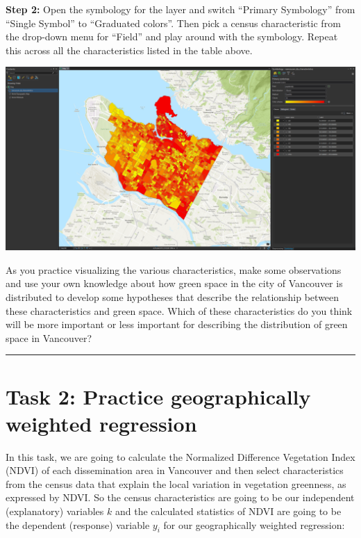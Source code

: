 \documentclass[
]{book}
\begin{document}
\textbf{Step 2:} Open the symbology for the layer and switch ``Primary Symbology'' from ``Single Symbol'' to ``Graduated colors''. Then pick a census characteristic from the drop-down menu for ``Field'' and play around with the symbology. Repeat this across all the characteristics listed in the table above.

\includegraphics[width=1\linewidth]{images/06-vancouver-2021-popdensity}

As you practice visualizing the various characteristics, make some observations and use your own knowledge about how green space in the city of Vancouver is distributed to develop some hypotheses that describe the relationship between these characteristics and green space. Which of these characteristics do you think will be more important or less important for describing the distribution of green space in Vancouver?

\begin{center}\rule{0.5\linewidth}{0.5pt}\end{center}

\hypertarget{task-2-practice-geographically-weighted-regression}{%
\section*{Task 2: Practice geographically weighted regression}\label{task-2-practice-geographically-weighted-regression}}

In this task, we are going to calculate the Normalized Difference Vegetation Index (NDVI) of each dissemination area in Vancouver and then select characteristics from the census data that explain the local variation in vegetation greenness, as expressed by NDVI. So the census characteristics are going to be our independent (explanatory) variables \(k\) and the calculated statistics of NDVI are going to be the dependent (response) variable \(y_i\) for our geographically weighted regression:
\end{document}
